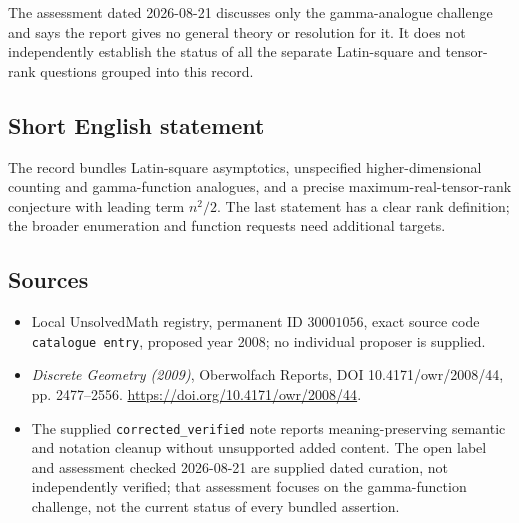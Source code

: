 \documentclass[11pt]{article}
\begin{document}
The assessment dated 2026-08-21 discusses only the gamma-analogue challenge and says the report gives no general theory or resolution for it. It does not independently establish the status of all the separate Latin-square and tensor-rank questions grouped into this record.
\subsection{Short English statement}
The record bundles Latin-square asymptotics, unspecified higher-dimensional counting and gamma-function analogues, and a precise maximum-real-tensor-rank conjecture with leading term \(n^2/2\). The last statement has a clear rank definition; the broader enumeration and function requests need additional targets.
\subsection{Sources}
\begin{itemize}
\item Local UnsolvedMath registry, permanent ID \(30001056\), exact source code \texttt{catalogue entry}, proposed year 2008; no individual proposer is supplied.
\item \emph{Discrete Geometry (2009)}, Oberwolfach Reports, DOI 10.4171/owr/2008/44, pp. 2477--2556. \url{https://doi.org/10.4171/owr/2008/44}.
\item The supplied \texttt{corrected\_verified} note reports meaning-preserving semantic and notation cleanup without unsupported added content. The open label and assessment checked 2026-08-21 are supplied dated curation, not independently verified; that assessment focuses on the gamma-function challenge, not the current status of every bundled assertion.
\end{itemize}
\end{document}

